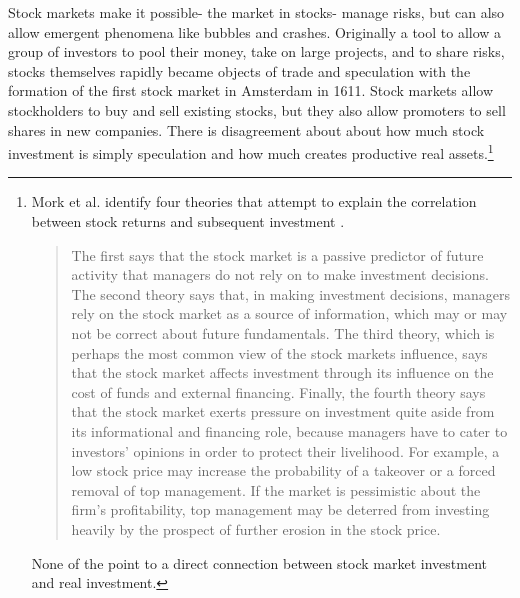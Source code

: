 Stock markets make it possible- the market in stocks- manage risks, but can also allow emergent phenomena like bubbles and crashes.
Originally a tool to allow a group of investors to pool their money, take on large projects, and to share risks, stocks themselves rapidly became objects of trade and speculation with the formation of  the first stock market in Amsterdam in 1611. Stock markets allow stockholders to buy and sell existing stocks, but they also allow promoters  to sell shares in new companies. There is disagreement about about how much  stock investment is simply speculation and how much creates productive real assets.\footnote{Mork et al. identify four theories that attempt to explain the correlation between stock returns and subsequent investment \cite{morckStockMarketInvestment1990}. \begin{quotation}The first says that the stock market is a passive predictor of future activity that managers do not rely on to make investment decisions. The second theory says that, in making investment decisions, managers rely on the stock market as a source of information, which may or may not be correct about future fundamentals. The third theory, which is perhaps the most common view of the stock markets influence, says that the stock market affects investment through its influence on the cost of funds and external financing. Finally, the fourth theory says that the stock market exerts pressure on investment quite aside from its informational and financing role, because managers have to cater to investors' opinions in order to protect their livelihood. For example, a low stock price may increase the probability of a takeover or a forced removal of top management. If the market is pessimistic about the firm's profitability, top management may be deterred from investing heavily by the prospect of further erosion in the stock price.\end{quotation} None of the point to a direct connection between stock market investment and real investment.} %


